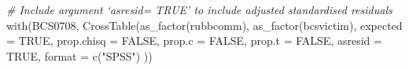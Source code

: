 \documentclass[
]{book}
\newenvironment{Shaded}{\begin{snugshade}}{\end{snugshade}}
\newcommand{\AttributeTok}[1]{\textcolor[rgb]{0.77,0.63,0.00}{#1}}
\newcommand{\CommentTok}[1]{\textcolor[rgb]{0.56,0.35,0.01}{\textit{#1}}}
\newcommand{\ConstantTok}[1]{\textcolor[rgb]{0.00,0.00,0.00}{#1}}
\newcommand{\FunctionTok}[1]{\textcolor[rgb]{0.00,0.00,0.00}{#1}}
\newcommand{\NormalTok}[1]{#1}
\newcommand{\StringTok}[1]{\textcolor[rgb]{0.31,0.60,0.02}{#1}}
\begin{document}
\begin{Shaded}
\begin{Highlighting}[]
\CommentTok{\# Include argument ‘asresid= TRUE’ to include adjusted standardised residuals}
\FunctionTok{with}\NormalTok{(BCS0708, }\FunctionTok{CrossTable}\NormalTok{(}\FunctionTok{as\_factor}\NormalTok{(rubbcomm), }\FunctionTok{as\_factor}\NormalTok{(bcsvictim), }\AttributeTok{expected =} \ConstantTok{TRUE}\NormalTok{,}
                         \AttributeTok{prop.chisq =} \ConstantTok{FALSE}\NormalTok{, }\AttributeTok{prop.c =} \ConstantTok{FALSE}\NormalTok{, }\AttributeTok{prop.t =} \ConstantTok{FALSE}\NormalTok{, }\AttributeTok{asresid =}
                           \ConstantTok{TRUE}\NormalTok{, }\AttributeTok{format =} \FunctionTok{c}\NormalTok{(}\StringTok{"SPSS"}\NormalTok{) ))}
\end{Highlighting}
\end{Shaded}
\end{document}
